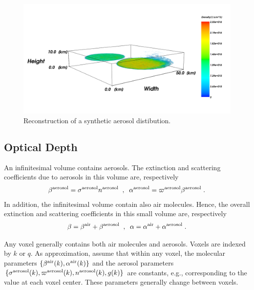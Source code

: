 \documentclass[10pt,twocolumn,letterpaper]{article}
\newcommand{\yoavcomment}[1]{}
\renewcommand{\yoavcomment}[1]{#1} %
\begin{document}
\begin{figure}
  \centering
  \yoavcomment{\includegraphics[width=\columnwidth]{images/front.png}}
    \caption{Reconstruction of a synthetic aerosol distibution.}
  \label{fig:front}
\end{figure}

\subsection{Optical Depth}
\label{sec:optical-depth}

An infinitesimal volume contains aerosols. The extinction and scattering coefficients due to aerosols in this volume are, respectively
\begin{equation}
  \beta^{\rm aerosol}=\sigma^{\rm aerosol} n^{\rm aerosol}
  \;\;,\;\;
  \alpha^{\rm aerosol}=\varpi^{\rm aerosol} \beta^{\rm aerosol}
  \;.
  \label{eq:betaer}
\end{equation}
In addition, the infinitesimal volume contain also air molecules. Hence, the overall
extinction and scattering coefficients in this small volume are, respectively
\begin{equation}
  \beta=\beta^{\rm air}+\beta^{\rm aerosol}
  \;\;,\;\;
  \alpha=\alpha^{\rm air}+\alpha^{\rm aerosol}
  \;.
  \label{eq:betair}
\end{equation}

Any voxel generally contains both air molecules and aerosols. Voxels are indexed by $k$ or $q$.
As approximation, assume that within any voxel, the molecular parameters
$\{ \beta^{\rm air}(k),\alpha^{\rm air}(k)\}$ and the aerosol parameters
$\{ \sigma^{\rm aerosol}(k),\varpi^{\rm aerosol}(k), n^{\rm aerosol}(k),g(k)\}$
are constants, e.g., corresponding to the value at each voxel center. These parameters generally change
between voxels.
\end{document}
